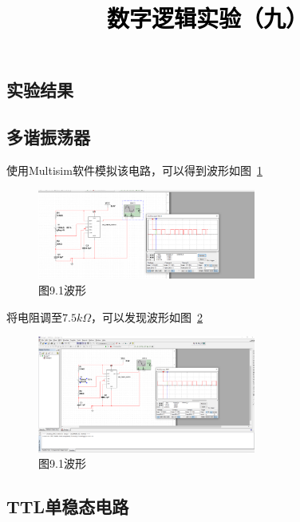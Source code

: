 \documentclass[a4paper,twoside]{ctexart}
\newcommand{\PaperTitle}{数字逻辑实验（九）}  %
\begin{document}
\newpage

\title{
	\Large{\textcolor{black}{\PaperTitle}}
}
 
\newpage
\setcounter{page}{1}

\begin{spacing}{1.2}


\setcounter{section}{6}

\section{实验结果}

\subsection{多谐振荡器}

使用Multisim软件模拟该电路，可以得到波形如图~\ref{fig:91}

\begin{figure}[htbp]
	\centering
	\caption{图9.1波形}
	\label{fig:91}
	\includegraphics[width=0.64\textwidth]{1.png}
\end{figure}

将电阻调至$7.5k\Omega$，可以发现波形如图~\ref{fig:91b}

\begin{figure}[htbp]
	\centering
	\caption{图9.1波形}
	\label{fig:91b}
	\includegraphics[width=0.64\textwidth]{2.png}
\end{figure}

\subsection{TTL单稳态电路}


\end{spacing}
\end{document}

